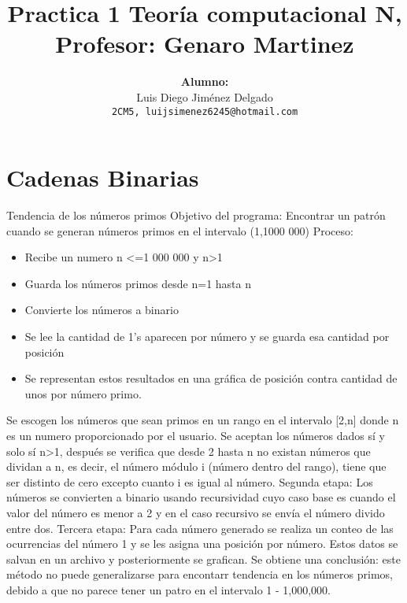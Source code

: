 \documentclass[a4paper]{article}
\title{Practica 1 \newline \newline
	  \large \textbf{ Teoría computacional N, Profesor: Genaro Martinez} }
\author{\Large \textbf{Alumno:} \\ Luis Diego Jiménez Delgado \\ 
		\texttt{2CM5, luijsimenez6245@hotmail.com}}
\begin{document}
	\begin{titlepage}
		\maketitle
	\end{titlepage}
	{ \large \tableofcontents }
	\newpage
        \section{Cadenas Binarias}
        Tendencia de los números primos
        Objetivo del programa: Encontrar un patrón cuando se generan números primos en el intervalo (1,1000 000)
        Proceso: 
            \begin{itemize}
                \item Recibe un numero n <=1 000 000 y n>1
                \item Guarda los números primos desde n=1 hasta n
                \item Convierte los números a binario
                \item Se lee la cantidad de 1’s aparecen por número y se guarda esa cantidad por posición
                \item  Se representan estos resultados en una gráfica de posición contra cantidad de unos por número primo.
            \end{itemize}
                Se escogen los números que sean primos en un rango en el intervalo [2,n] donde n es un numero proporcionado por el usuario. Se aceptan los números dados sí y solo sí n>1, después se verifica que desde 2 hasta n no existan números que dividan a n, es decir, el número módulo i (número dentro del rango), tiene que ser distinto de cero excepto cuanto i es igual al número.
                Segunda etapa: Los números se convierten a binario usando recursividad cuyo caso base es cuando el valor del número es menor a 2 y en el caso recursivo se envía el número divido entre dos.
                Tercera etapa: Para cada número generado se realiza un conteo de las ocurrencias del número 1 y se les asigna una posición por número. Estos datos se salvan en un archivo y posteriormente se grafican.
                Se obtiene una conclusión: este método no puede generalizarse para encontarr tendencia en los números primos, debido a que no parece tener un patro en el intervalo 1 - 1,000,000.
\end{document}
